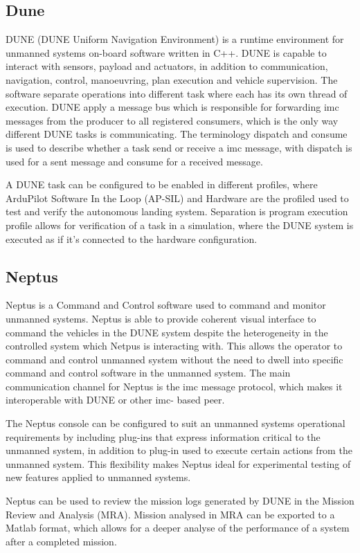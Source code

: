 \subsection{Dune}
DUNE (DUNE Uniform Navigation Environment) is a runtime environment for unmanned systems on-board software written in C++. DUNE is capable to interact with sensors, payload and actuators, in addition to communication, navigation, control, manoeuvring, plan execution and vehicle supervision. The software separate operations into different task where each has its own thread of execution. DUNE apply a message bus which is responsible for forwarding \gls{imc} messages from the producer to all registered consumers, which is the only way different DUNE tasks is communicating. The terminology dispatch and consume is used to describe whether a task send or receive a \gls{imc} message, with dispatch is used for a sent message and consume for a received message. 

A DUNE task can be configured to be enabled in different profiles, where ArduPilot Software In the Loop (AP-SIL) and Hardware are the profiled used to test and verify the autonomous landing system. Separation is program execution profile allows for verification of a task in a simulation, where the DUNE system is executed as if it's connected to the hardware configuration.
\subsection{Neptus}
Neptus is a Command and Control software used to command and monitor unmanned systems. Neptus is able to provide coherent visual interface to command the vehicles in the DUNE system despite the heterogeneity in the controlled system which Netpus is interacting with. This allows the operator to command and control unmanned system without the need to dwell into specific command and control software in the unmanned system. The main communication channel for Neptus is the \gls{imc} message protocol, which makes it interoperable with DUNE or other \gls{imc}- based peer.

The Neptus console can be configured to suit an unmanned systems operational requirements by including plug-ins that express information critical to the unmanned system, in addition to plug-in used to execute certain actions from the unmanned system. This flexibility makes Neptus ideal for experimental testing of new features  applied to unmanned systems.   

Neptus can be used to review the mission logs generated by DUNE in the Mission Review and Analysis (MRA). Mission analysed in MRA can be exported to a Matlab format, which allows for a deeper analyse of the performance of a system after a completed mission.
